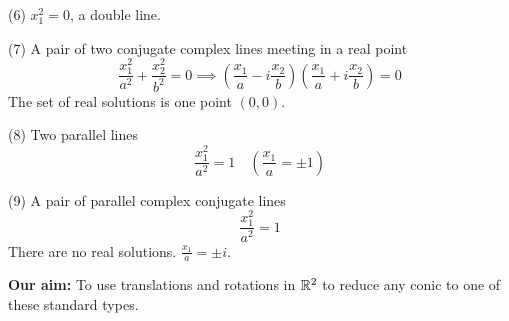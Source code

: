 \documentclass[10pt]{scrartcl}
\begin{document}
\begin{center}
\end{center}


(6) $x_1^2 = 0$, a double line. 



(7) A pair of two conjugate complex lines meeting in a real point
\[
  \frac{x_1^2}{a^2} + \frac{x_2^2}{b^2} = 0 \implies \left(\frac{x_1}{a} - i\frac{x_2}{b}\right)
  \left(\frac{x_1}{a} + i\frac{x_2}{b}\right) 
  = 0
\]
The set of real solutions is one point $(0,0)$. 

(8) Two parallel lines
\[
  \frac{x_1^2}{a^2} = 1 \quad (\frac{x_1}{a} = \pm 1)
\]


\begin{center}
\end{center}


(9) A pair of parallel complex conjugate lines
\[
  \frac{x_1^2}{a^2} = 1
\]
There are no real solutions. $\frac{x_1}{a} = \pm i$.


\textbf{Our aim:} To use translations and rotations in $\mathbb{R}^2$ to reduce any conic to one of these standard types. 
\end{document}
